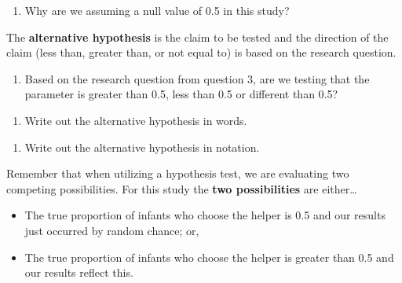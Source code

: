 \documentclass[
]{report}
\providecommand{\tightlist}{%
  \setlength{\itemsep}{0pt}\setlength{\parskip}{0pt}}
\begin{document}
\vspace{0.5in}

\begin{enumerate}
\def\labelenumi{\arabic{enumi}.}
\setcounter{enumi}{9}
\tightlist
\item
  Why are we assuming a null value of 0.5 in this study?
\end{enumerate}

\vspace{0.3in}

The \textbf{alternative hypothesis} is the claim to be tested and the direction of the claim (less than, greater than, or not equal to) is based on the research question.

\begin{enumerate}
\def\labelenumi{\arabic{enumi}.}
\setcounter{enumi}{10}
\tightlist
\item
  Based on the research question from question 3, are we testing that the parameter is greater than 0.5, less than 0.5 or different than 0.5?
\end{enumerate}

\vspace{0.4in}

\begin{enumerate}
\def\labelenumi{\arabic{enumi}.}
\setcounter{enumi}{11}
\tightlist
\item
  Write out the alternative hypothesis in words.
\end{enumerate}

\vspace{1in}

\begin{enumerate}
\def\labelenumi{\arabic{enumi}.}
\setcounter{enumi}{12}
\tightlist
\item
  Write out the alternative hypothesis in notation.
\end{enumerate}

\vspace{0.5in}

Remember that when utilizing a hypothesis test, we are evaluating two competing possibilities. For this study the \textbf{two possibilities} are either\ldots{}

\begin{itemize}
\item
  The true proportion of infants who choose the helper is 0.5 and our results just occurred by random chance; or,
\item
  The true proportion of infants who choose the helper is greater than 0.5 and our results reflect this.
\end{itemize}
\end{document}
